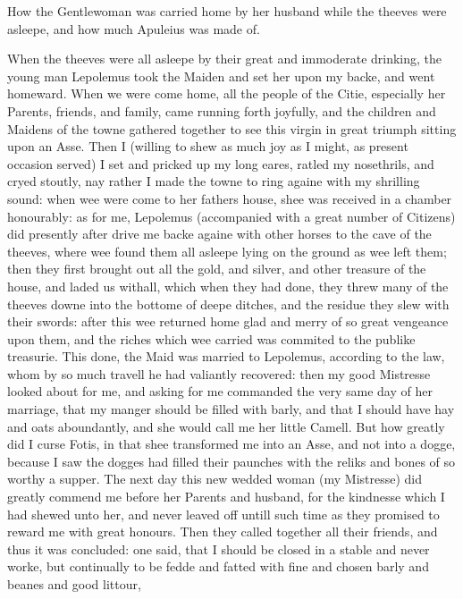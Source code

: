 
How the Gentlewoman was carried home by her husband while the theeves were
asleepe, and how much Apuleius was made of.

When the theeves were all asleepe by their great and immoderate drinking, the
young man Lepolemus took the Maiden and set her upon my backe, and went
homeward. When we were come home, all the people of the Citie, especially her
Parents, friends, and family, came running forth joyfully, and the children and
Maidens of the towne gathered together to see this virgin in great triumph
sitting upon an Asse. Then I (willing to shew as much joy as I might, as
present occasion served) I set and pricked up my long eares, ratled my
nosethrils, and cryed stoutly, nay rather I made the towne to ring againe with
my shrilling sound: when wee were come to her fathers house, shee was received
in a chamber honourably: as for me, Lepolemus (accompanied with a great number
of Citizens) did presently after drive me backe againe with other horses to the
cave of the theeves, where wee found them all asleepe lying on the ground as
wee left them; then they first brought out all the gold, and silver, and other
treasure of the house, and laded us withall, which when they had done, they
threw many of the theeves downe into the bottome of deepe ditches, and the
residue they slew with their swords: after this wee returned home glad and
merry of so great vengeance upon them, and the riches which wee carried was
commited to the publike treasurie. This done, the Maid was married to
Lepolemus, according to the law, whom by so much travell he had valiantly
recovered: then my good Mistresse looked about for me, and asking for me
commanded the very same day of her marriage, that my manger should be filled
with barly, and that I should have hay and oats aboundantly, and she would call
me her little Camell. But how greatly did I curse Fotis, in that shee
transformed me into an Asse, and not into a dogge, because I saw the dogges had
filled their paunches with the reliks and bones of so worthy a supper. The next
day this new wedded woman (my Mistresse) did greatly commend me before her
Parents and husband, for the kindnesse which I had shewed unto her, and never
leaved off untill such time as they promised to reward me with great honours.
Then they called together all their friends, and thus it was concluded: one
said, that I should be closed in a stable and never worke, but continually to
be fedde and fatted with fine and chosen barly and beanes and good littour,
